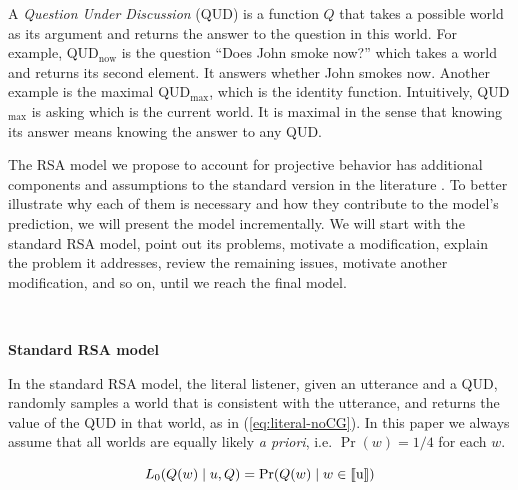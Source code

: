 A \emph{Question Under Discussion} (QUD) \cite{Roberts2012:Information-Structure} is a function $Q$ that takes a possible world as 
 its argument and returns the answer to the question in this world.
For example, QUD$_\textrm{now}$ is the question ``Does John smoke now?'' which takes a world and returns its second element.
It answers whether John smokes now. 
Another example is the maximal QUD$_\textrm{max}$, which is the identity function. 
Intuitively, QUD$_\textrm{max}$ is asking which is the current world.
It is maximal in the sense that knowing its answer means knowing the answer to 
 any QUD.
 
The RSA model we propose to account for projective behavior has additional 
 components and assumptions to the standard version in the literature
 \cite{FrankGoodman2012:Predicting-Pragmatic-Reasoning-,GoodmanStuhlmuller2013:Knowledge-and-I}.
To better illustrate why each of them is necessary and how they contribute to 
 the model's prediction, we will present the model incrementally. 
We will start with the standard RSA model, point out its problems, motivate 
 a modification, explain the problem it addresses, review the remaining issues, 
 motivate another modification, and so on, until we reach the final model.

\ 

\noindent\textbf{Standard RSA model}

In the standard RSA model, the literal listener, given an utterance and a QUD, 
 randomly samples a world that is consistent with the utterance, 
 and returns the value of the QUD in that world, as in (\ref{eq:literal-noCG}). 
In this paper we always assume that all worlds are equally likely \emph{a priori}, 
 i.e. $\Pr(w)=1/4$ for each $w$.

\begin{equation}
L_0(Q(w) \mid u, Q) = \Pr(Q(w) \mid w \in \llbracket \text{u} \rrbracket) \label{eq:literal-noCG}
\end{equation}
 
